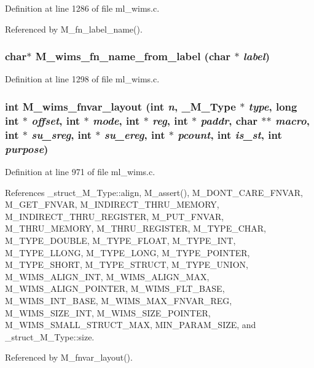 Definition at line 1286 of file ml\_\-wims.c.

Referenced by M\_\-fn\_\-label\_\-name().
\subsubsection{\setlength{\rightskip}{0pt plus 5cm}char$\ast$ M\_\-wims\_\-fn\_\-name\_\-from\_\-label (char $\ast$ {\em label})}\label{ml__wims_8c_21169e6a1c9a19297104e104b42b11f3}




Definition at line 1298 of file ml\_\-wims.c.
\subsubsection{\setlength{\rightskip}{0pt plus 5cm}int M\_\-wims\_\-fnvar\_\-layout (int {\em n}, \bf{\_\-M\_\-Type} $\ast$ {\em type}, long int $\ast$ {\em offset}, int $\ast$ {\em mode}, int $\ast$ {\em reg}, int $\ast$ {\em paddr}, char $\ast$$\ast$ {\em macro}, int $\ast$ {\em su\_\-sreg}, int $\ast$ {\em su\_\-ereg}, int $\ast$ {\em pcount}, int {\em is\_\-st}, int {\em purpose})}\label{ml__wims_8c_688045fdcb83e75df5f6b6af7a523cd5}




Definition at line 971 of file ml\_\-wims.c.

References \_\-struct\_\-M\_\-Type::align, M\_\-assert(), M\_\-DONT\_\-CARE\_\-FNVAR, M\_\-GET\_\-FNVAR, M\_\-INDIRECT\_\-THRU\_\-MEMORY, M\_\-INDIRECT\_\-THRU\_\-REGISTER, M\_\-PUT\_\-FNVAR, M\_\-THRU\_\-MEMORY, M\_\-THRU\_\-REGISTER, M\_\-TYPE\_\-CHAR, M\_\-TYPE\_\-DOUBLE, M\_\-TYPE\_\-FLOAT, M\_\-TYPE\_\-INT, M\_\-TYPE\_\-LLONG, M\_\-TYPE\_\-LONG, M\_\-TYPE\_\-POINTER, M\_\-TYPE\_\-SHORT, M\_\-TYPE\_\-STRUCT, M\_\-TYPE\_\-UNION, M\_\-WIMS\_\-ALIGN\_\-INT, M\_\-WIMS\_\-ALIGN\_\-MAX, M\_\-WIMS\_\-ALIGN\_\-POINTER, M\_\-WIMS\_\-FLT\_\-BASE, M\_\-WIMS\_\-INT\_\-BASE, M\_\-WIMS\_\-MAX\_\-FNVAR\_\-REG, M\_\-WIMS\_\-SIZE\_\-INT, M\_\-WIMS\_\-SIZE\_\-POINTER, M\_\-WIMS\_\-SMALL\_\-STRUCT\_\-MAX, MIN\_\-PARAM\_\-SIZE, and \_\-struct\_\-M\_\-Type::size.

Referenced by M\_\-fnvar\_\-layout().
